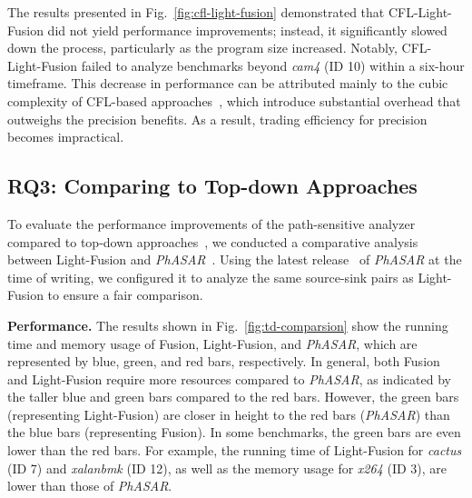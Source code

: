 The results presented in Fig.~\ref{fig:cfl-light-fusion} demonstrated that CFL-Light-Fusion did not yield performance improvements; instead, it significantly slowed down the process, particularly as the program size increased. 
Notably, CFL-Light-Fusion failed to analyze benchmarks beyond \textit{cam4} (ID 10) within a six-hour timeframe. 
This decrease in performance can be attributed mainly to the cubic complexity of CFL-based approaches~\cite{kodumal2004set, chaudhuri2008subcubic, yannakakis1990graph, melski2000interconvertibility}, which introduce substantial overhead that outweighs the precision benefits. 
As a result, trading efficiency for precision becomes impractical. 



\subsection{RQ3: Comparing to Top-down Approaches}

\label{sec:rq3}


To evaluate the performance improvements of the path-sensitive analyzer compared to top-down approaches~\cite{reps1995precise, reps1994speeding, arzt2014flowdroid, murphy1999program, sagiv1996precise}, we conducted a comparative analysis between Light-Fusion and \textit{PhASAR}~\cite{10.1007/978-3-030-17465-1_22}. 
Using the latest release~\cite{phasar} of \textit{PhASAR} at the time of writing, we configured it to analyze the same source-sink pairs as Light-Fusion to ensure a fair comparison. 

\textbf{Performance.}
The results shown in Fig.~\ref{fig:td-comparsion} show the running time and memory usage of Fusion, Light-Fusion, and \textit{PhASAR}, which are represented by blue, green, and red bars, respectively. 
In general, both Fusion and Light-Fusion require more resources compared to \textit{PhASAR}, as indicated by the taller blue and green bars compared to the red bars. 
However, the green bars (representing Light-Fusion) are closer in height to the red bars (\textit{PhASAR}) than the blue bars (representing Fusion). 
In some benchmarks, the green bars are even lower than the red bars. 
For example, the running time of Light-Fusion for \textit{cactus} (ID 7) and \textit{xalanbmk} (ID 12), as well as the memory usage for \textit{x264} (ID 3), are lower than those of \textit{PhASAR}.

